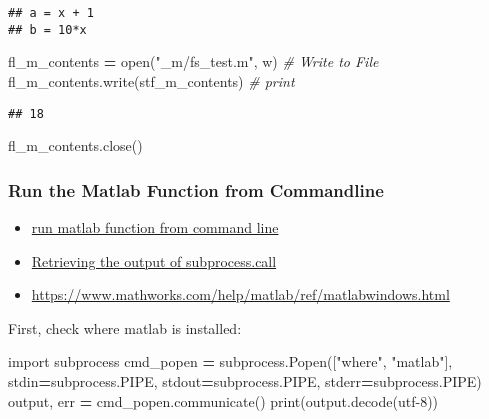 \documentclass[
]{book}
\newenvironment{Shaded}{\begin{snugshade}}{\end{snugshade}}
\newcommand{\BuiltInTok}[1]{#1}
\newcommand{\CommentTok}[1]{\textcolor[rgb]{0.56,0.35,0.01}{\textit{#1}}}
\newcommand{\ImportTok}[1]{#1}
\newcommand{\NormalTok}[1]{#1}
\newcommand{\OperatorTok}[1]{\textcolor[rgb]{0.81,0.36,0.00}{\textbf{#1}}}
\newcommand{\StringTok}[1]{\textcolor[rgb]{0.31,0.60,0.02}{#1}}
\providecommand{\tightlist}{%
  \setlength{\itemsep}{0pt}\setlength{\parskip}{0pt}}
\begin{document}
\begin{verbatim}
## a = x + 1
## b = 10*x
\end{verbatim}

\begin{Shaded}
\begin{Highlighting}[]
\NormalTok{fl\_m\_contents }\OperatorTok{=} \BuiltInTok{open}\NormalTok{(}\StringTok{"\_m/fs\_test.m"}\NormalTok{, }\StringTok{\textquotesingle{}w\textquotesingle{}}\NormalTok{)}
\CommentTok{\# Write to File}
\NormalTok{fl\_m\_contents.write(stf\_m\_contents)}
\CommentTok{\# print}
\end{Highlighting}
\end{Shaded}

\begin{verbatim}
## 18
\end{verbatim}

\begin{Shaded}
\begin{Highlighting}[]
\NormalTok{fl\_m\_contents.close()}
\end{Highlighting}
\end{Shaded}

\hypertarget{run-the-matlab-function-from-commandline}{%
\subsubsection{Run the Matlab Function from Commandline}\label{run-the-matlab-function-from-commandline}}

\begin{itemize}
\tightlist
\item
  \href{https://www.mathworks.com/matlabcentral/answers/327116-run-function-from-command-line}{run matlab function from command line}
\item
  \href{https://stackoverflow.com/a/1996540/8280804}{Retrieving the output of subprocess.call}
\item
  \url{https://www.mathworks.com/help/matlab/ref/matlabwindows.html}
\end{itemize}

First, check where matlab is installed:

\begin{Shaded}
\begin{Highlighting}[]
\ImportTok{import}\NormalTok{ subprocess}
\NormalTok{cmd\_popen }\OperatorTok{=}\NormalTok{ subprocess.Popen([}\StringTok{"where"}\NormalTok{, }\StringTok{"matlab"}\NormalTok{],}
\NormalTok{                             stdin}\OperatorTok{=}\NormalTok{subprocess.PIPE,}
\NormalTok{                             stdout}\OperatorTok{=}\NormalTok{subprocess.PIPE,}
\NormalTok{                             stderr}\OperatorTok{=}\NormalTok{subprocess.PIPE)}
\NormalTok{output, err }\OperatorTok{=}\NormalTok{ cmd\_popen.communicate()}
\BuiltInTok{print}\NormalTok{(output.decode(}\StringTok{\textquotesingle{}utf{-}8\textquotesingle{}}\NormalTok{))}
\end{Highlighting}
\end{Shaded}
\end{document}
